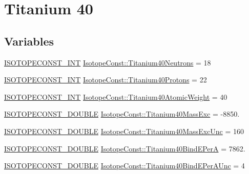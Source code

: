 \hypertarget{group___isotope_const-_titanium-_ti40}{}\section{Titanium 40}
\label{group___isotope_const-_titanium-_ti40}
\subsection*{Variables}
\begin{DoxyCompactItemize}
\item 
\mbox{\hyperlink{group___isotope_const-_macros_ga5f18360b3e99483a35c32d789e62621c}{I\+S\+O\+T\+O\+P\+E\+C\+O\+N\+S\+T\+\_\+\+I\+NT}} \mbox{\hyperlink{group___isotope_const-_titanium-_ti40_ga507659d7674dfd487f1ed69e87843aa5}{Isotope\+Const\+::\+Titanium40\+Neutrons}} = 18
\item 
\mbox{\hyperlink{group___isotope_const-_macros_ga5f18360b3e99483a35c32d789e62621c}{I\+S\+O\+T\+O\+P\+E\+C\+O\+N\+S\+T\+\_\+\+I\+NT}} \mbox{\hyperlink{group___isotope_const-_titanium-_ti40_ga887fbc00ea33840ce0e6163a1125d3d9}{Isotope\+Const\+::\+Titanium40\+Protons}} = 22
\item 
\mbox{\hyperlink{group___isotope_const-_macros_ga5f18360b3e99483a35c32d789e62621c}{I\+S\+O\+T\+O\+P\+E\+C\+O\+N\+S\+T\+\_\+\+I\+NT}} \mbox{\hyperlink{group___isotope_const-_titanium-_ti40_ga096415e3d76d6afada6ac98f189ef0fc}{Isotope\+Const\+::\+Titanium40\+Atomic\+Weight}} = 40
\item 
\mbox{\hyperlink{group___isotope_const-_macros_ga8f45a7272ce02c0b4c65c44636ed719a}{I\+S\+O\+T\+O\+P\+E\+C\+O\+N\+S\+T\+\_\+\+D\+O\+U\+B\+LE}} \mbox{\hyperlink{group___isotope_const-_titanium-_ti40_ga65e93841720be76490a8c3fd2959cc9b}{Isotope\+Const\+::\+Titanium40\+Mass\+Exc}} = -\/8850.
\item 
\mbox{\hyperlink{group___isotope_const-_macros_ga8f45a7272ce02c0b4c65c44636ed719a}{I\+S\+O\+T\+O\+P\+E\+C\+O\+N\+S\+T\+\_\+\+D\+O\+U\+B\+LE}} \mbox{\hyperlink{group___isotope_const-_titanium-_ti40_ga9e7362dbdecb8f8f89e7ba12b8297bb7}{Isotope\+Const\+::\+Titanium40\+Mass\+Exc\+Unc}} = 160
\item 
\mbox{\hyperlink{group___isotope_const-_macros_ga8f45a7272ce02c0b4c65c44636ed719a}{I\+S\+O\+T\+O\+P\+E\+C\+O\+N\+S\+T\+\_\+\+D\+O\+U\+B\+LE}} \mbox{\hyperlink{group___isotope_const-_titanium-_ti40_ga59f8d539cc567cd3153ca50f426473aa}{Isotope\+Const\+::\+Titanium40\+Bind\+E\+PerA}} = 7862.
\item 
\mbox{\hyperlink{group___isotope_const-_macros_ga8f45a7272ce02c0b4c65c44636ed719a}{I\+S\+O\+T\+O\+P\+E\+C\+O\+N\+S\+T\+\_\+\+D\+O\+U\+B\+LE}} \mbox{\hyperlink{group___isotope_const-_titanium-_ti40_gab02b4926337c8c05a0cbce8948ce712e}{Isotope\+Const\+::\+Titanium40\+Bind\+E\+Per\+A\+Unc}} = 4

\end{DoxyCompactItemize}
